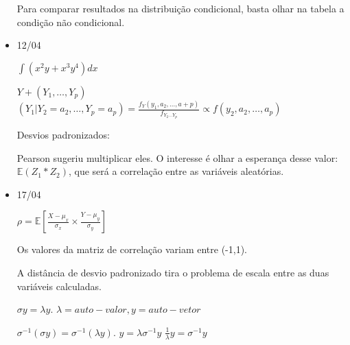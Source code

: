 \documentclass[11pt,a4paper]{book}
\begin{document}
\begin{itemize}
		 Para comparar resultados na distribuição condicional, basta olhar na tabela a condição não condicional.
		 
		 \item 12/04
		 
		 $\int (x^2y+x^3y^4)dx$
		 
		 $Y+(Y_1,\ldots,Y_p)$
		 $(Y_1|Y_2=a_2,\ldots,Y_p=a_p)=\frac{f_Y(y_1,a_2,\ldots,a+p)}{f_{Y_2\ldots Y_p}}\propto f(y_2,a_2,\ldots,a_p)$
		 
		 Desvios padronizados:
		 
		 Pearson sugeriu multiplicar eles.
		 O interesse é olhar a esperança desse valor: $\mathbb{E}(Z_1*Z_2)$, que será a correlação entre as variáveis aleatórias.
		 
		 \item 17/04
		 
		 $\rho=\mathbb{E}[\frac{X-\mu_x}{\sigma_x}\times\frac{Y-\mu_y}{\sigma_y}]$
		 
		 Os valores da matriz de correlação variam entre (-1,1).
		 
		 A distância de desvio padronizado tira o problema de escala entre as duas variáveis calculadas.
		 
		 $\sigma y=\lambda y$.
		 $\lambda= auto-valor, y=auto-vetor$
		 
		 
		 $\sigma^{-1}(\sigma y)=\sigma^{-1}(\lambda y)$.
		 $y=\lambda\sigma^{-1}y$
		 $\frac{1}{\lambda}y=\sigma^{-1}y$
		 
		 
	\end{itemize}
\end{document}
